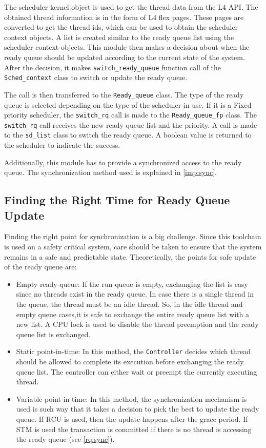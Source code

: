 The scheduler kernel object is used to get the thread data from the L4 API. The obtained thread information is in the form of L4 flex pages. These pages are converted to get the thread ids, which can be used to obtain the scheduler context objects. A list is created similar to the ready queue list using the scheduler context objects. This module then makes a decision about when the ready queue should be updated according to the current state of the system. After the decision, it makes \texttt{switch\_ready\_queue} function call of the \texttt{Sched\_context} class to switch or update the ready queue.

The call is then transferred to the \texttt{Ready\_queue} class. The type of the ready queue is selected depending on the type of the scheduler in use. If it is a Fixed priority scheduler, the \texttt{switch\_rq} call is made to the \texttt{Ready\_queue\_fp} class. The \texttt{switch\_rq} call receives the new ready queue list and the priority. A call is made to the \texttt{sd\_list} class to switch the ready queue. A boolean value is returned to the scheduler to indicate the success.

Additionally, this module has to provide a synchronized access to the ready queue. The synchronization method used is explained in \ref{imp:sync}. 

\subsection{Finding the Right Time for Ready Queue Update}\label{design:time}
Finding the right point for synchronization is a big challenge. Since this toolchain is used on a safety critical system, care should be taken to ensure that the system remains in a safe and predictable state. Theoretically, the points for safe update of the ready queue are:

\begin{itemize}
\item Empty ready-queue: If the run queue is empty, exchanging the list is easy since no threads exist in the ready queue. In case there is a single thread in the queue, the thread must be an idle thread. So, in the idle thread and empty queue cases,it is safe to exchange the entire ready queue list with a new list. A CPU lock is used to disable the thread preemption and the ready queue list is exchanged.

\item Static point-in-time: In this method, the \texttt{Controller} decides which thread should be allowed to complete its execution before exchanging the ready queue list. The controller can either wait or preempt the currently executing thread.

\item Variable point-in-time: In this method, the synchronization mechanism is used is such way that it takes a decision to pick the best to update the ready queue. If RCU is used, then the update happens after the grace period. If STM is used the transaction is committed if there is no thread is accessing the ready queue (see \ref{rq:sync}).

\end{itemize}
